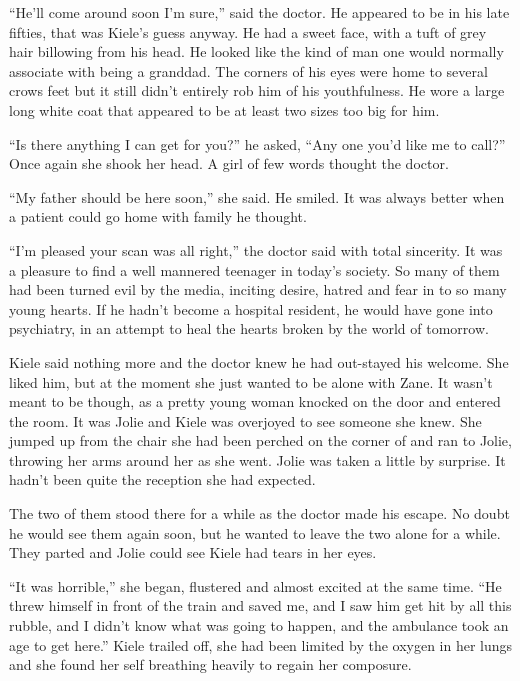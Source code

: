 ``He'll come around soon I'm sure,'' said the doctor.  He appeared to be in his late fifties, that was Kiele's guess anyway.  He had a sweet face, with a tuft of grey hair billowing from his head.  He looked like the kind of man one would normally associate with being a granddad.  The corners of his eyes were home to several crows feet but it still didn't entirely rob him of his youthfulness.  He wore a large long white coat that appeared to be at least two sizes too big for him.  

``Is there anything I can get for you?'' he asked, ``Any one you'd like me to call?''  Once again she shook her head.  A girl of few words thought the doctor.

``My father should be here soon,'' she said.  He smiled.  It was always better when a patient could go home with family he thought.  

``I'm pleased your scan was all right,'' the doctor said with total sincerity.  It was a pleasure to find a well mannered teenager in today's society.  So many of them had been turned evil by the media, inciting desire, hatred and fear in to so many young hearts.  If he hadn't become a hospital resident, he would have gone into psychiatry, in an attempt to heal the hearts broken by the world of tomorrow.

Kiele said nothing more and the doctor knew he had out-stayed his welcome.  She liked him, but at the moment she just wanted to be alone with Zane.  It wasn't meant to be though, as a pretty young woman knocked on the door and entered the room.  It was Jolie and Kiele was overjoyed to see someone she knew.  She jumped up from the chair she had been perched on the corner of and ran to Jolie, throwing her arms around her as she went.  Jolie was taken a little by surprise.  It hadn't been quite the reception she had expected.

The two of them stood there for a while as the doctor made his escape.  No doubt he would see them again soon, but he wanted to leave the two alone for a while.  They parted and Jolie could see Kiele had tears in her eyes.  

``It was horrible,'' she began, flustered and almost excited at the same time.  ``He threw himself in front of the train and saved me, and I saw him get hit by all this rubble, and I didn't know what was going to happen, and the ambulance took an age to get here.''  Kiele trailed off, she had been limited by the oxygen in her lungs and she found her self breathing heavily to regain her composure.  

